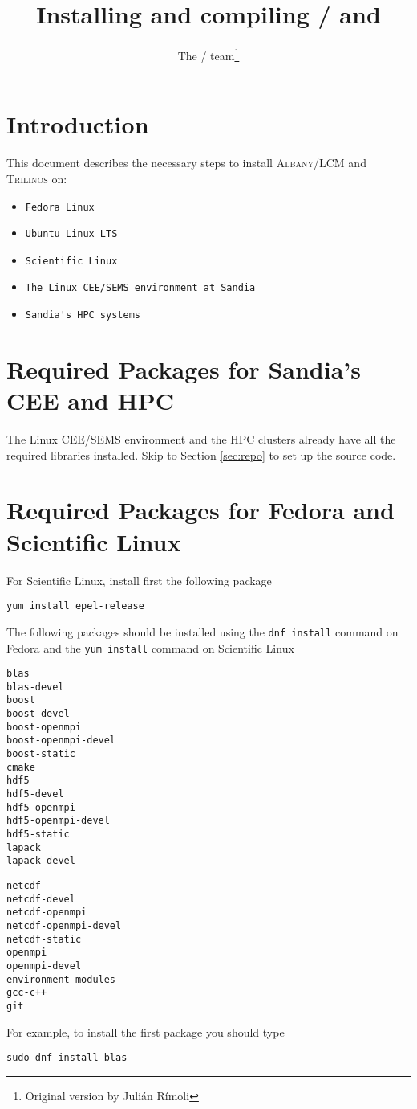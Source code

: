 \documentclass{article}
\title{Installing and compiling \albany{}/\lcm{} and
  \trilinos{}}
\author{The \albany{}/\lcm{} team\thanks{Original version by Juli\'an
    R\'imoli}}
\newcommand{\trilinos}{\textsc{Trilinos}}
\newcommand{\albany}{\textsc{Albany}}
\newcommand{\lcm}{\textsc{LCM}}
\begin{document}
\maketitle

\section{Introduction}
This document describes the necessary steps to install \albany{}/\lcm{} and
\trilinos{} on:
\begin{itemize}
\item \verb+Fedora Linux+
\item \verb+Ubuntu Linux LTS+
\item \verb+Scientific Linux+
\item \verb+The Linux CEE/SEMS environment at Sandia+
\item \verb+Sandia's HPC systems+
\end{itemize}

\section{Required Packages for Sandia's CEE and HPC}
The Linux CEE/SEMS environment and the HPC clusters already have all the
required libraries installed. Skip to Section \ref{sec:repo} to set up the
source code.

\section{Required Packages for Fedora and Scientific Linux}
For Scientific Linux, install first the following package
\begin{verbatim}
yum install epel-release
\end{verbatim}
The following packages should be installed using the \verb+dnf install+ command
on Fedora and the \verb+yum install+ command on Scientific Linux
\begin{verbatim}
blas
blas-devel
boost
boost-devel
boost-openmpi
boost-openmpi-devel
boost-static
cmake
hdf5
hdf5-devel
hdf5-openmpi
hdf5-openmpi-devel
hdf5-static
lapack
lapack-devel
\end{verbatim}

\begin{verbatim}
netcdf
netcdf-devel
netcdf-openmpi
netcdf-openmpi-devel
netcdf-static
openmpi
openmpi-devel
environment-modules
gcc-c++
git
\end{verbatim}

For example, to install the first package you should type
\begin{verbatim}
sudo dnf install blas
\end{verbatim}
\end{document}
